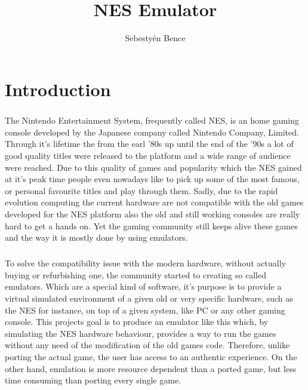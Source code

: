 \documentclass[]{report}
\title{NES Emulator}
\author{Sebestyén Bence}
\begin{document}
\maketitle

\tableofcontents

\clearpage

\chapter{Introduction}

\paragraph{}
The Nintendo Entertainment System, frequently called NES, is an home gaming console developed by the Japanese company called Nintendo Company, Limited.  Through it's lifetime the from the earl '80s up until the end of the '90s a lot of good quality titles were released to the platform and a wide range of audience were reached. Due to this quality of games and  popularity which the NES gained at it's peak time people even nowadays like to pick up some of the most famous, or personal favourite titles and play through them. Sadly, due to the rapid evolution computing the current hardware are not compatible with the old games developed for the NES platform also the old and still working consoles are really hard to get a hands on. Yet the gaming community still keeps alive these games and the way it is mostly done by using emulators.

\paragraph{ }
To solve the compatibility issue with the modern hardware, without actually buying or refurbishing one, the community started to creating so called emulators. Which are a special kind of software, it's purpose is to provide a virtual simulated environment of a given old or very specific hardware, such as the NES for instance, on top of a given system, like PC or any other gaming console. This projects goal is to produce an emulator like this which, by simulating the NES hardware behaviour, provides a way to run the games without any need of the modification of the old games code. Therefore, unlike porting the actual game, the user has access to an authentic experience. On the other hand, emulation is more resource dependent than a ported game, but less time consuming than porting every single game.
\end{document}
